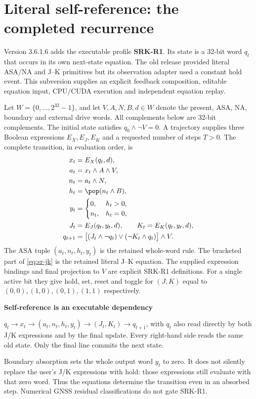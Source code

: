\section{Literal self-reference: the completed recurrence}
\label{sec:selfref}
Version 3.6.1.6 adds the executable profile \textbf{SRK-R1}. Its state is a
32-bit word $q_t$ that occurs in its own next-state equation. The old release
provided literal ASA/NA and J--K primitives but its observation adapter used a
constant hold event. This subversion supplies an explicit feedback composition,
editable equation input, CPU/CUDA execution and independent equation replay.

Let $W=\{0,\ldots,2^{32}-1\}$, and let $V,A,N,B,d\in W$ denote the present,
ASA, NA, boundary and external drive words. All complements below are 32-bit
complements. The initial state satisfies $q_0\land\neg V=0$. A trajectory supplies
three Boolean expressions $E_X,E_J,E_K$ and a requested number of steps $T>0$.
The complete transition, in evaluation order, is
\begin{align}
x_t &= E_X(q_t,d),\label{eq:sr-x}\\
a_t &= x_t\land A\land V,\\
n_t &= a_t\land N,\\
h_t &= \pop(n_t\land B),\\
y_t &= \begin{cases}0,&h_t>0,\\ n_t,&h_t=0,\end{cases}\label{eq:sr-asa}\\
J_t &= E_J(q_t,y_t,d),\qquad K_t=E_K(q_t,y_t,d),\\
q_{t+1} &= \big[(J_t\land\neg q_t)\lor(\neg K_t\land q_t)\big]\land V.
\label{eq:sr-jk}
\end{align}
The ASA tuple $(a_t,n_t,h_t,y_t)$ is the retained whole-word rule. The bracketed
part of \eqref{eq:sr-jk} is the retained literal J--K equation. The supplied
expression bindings and final projection to $V$ are explicit SRK-R1 definitions.
For a single active bit they give hold, set, reset and toggle for $(J,K)$ equal
to $(0,0),(1,0),(0,1),(1,1)$ respectively.

\begin{panel}
\textbf{Self-reference is an executable dependency}\par
$q_t\longrightarrow x_t\longrightarrow(a_t,n_t,h_t,y_t)
\longrightarrow(J_t,K_t)\longrightarrow q_{t+1}$, with $q_t$ also read directly
by both J/K expressions and by the final update. Every right-hand side reads the
same old state. Only the final line commits the next state.
\end{panel}
Boundary absorption sets the whole output word $y_t$ to zero. It does not
silently replace the user's J/K expressions with hold: those expressions still
evaluate with that zero word. Thus the equations determine the transition even
in an absorbed step. Numerical GNSS residual classifications do not gate SRK-R1.
\clearpage

